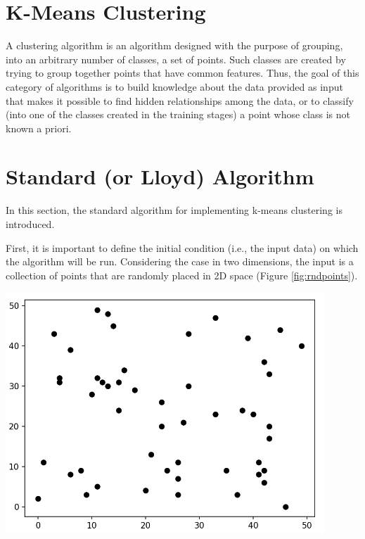 \documentclass{report}
\begin{document}
\begin{minipage}[b]{0.48\textwidth}
  \section*{K-Means Clustering}
  A clustering algorithm is an algorithm designed with the purpose of grouping, into an arbitrary number of classes, a set of points. Such classes are created by trying to group together points that have common features. Thus, the goal of this category of algorithms is to build knowledge about the data provided as input that makes it possible to find hidden relationships among the data, or to classify (into one of the classes created in the training stages) a point whose class is not known a priori.

  \section*{Standard (or Lloyd) Algorithm}
  In this section, the standard algorithm for implementing k-means clustering is introduced. 

  First, it is important to define the initial condition (i.e., the input data) on which the algorithm will be run. Considering the case in two dimensions, the input is a collection of points that are randomly placed in 2D space (Figure \ref{fig:rndpoints}).

  \begin{center} 
      \includegraphics[width = 0.9\textwidth]{imgs/rndpoints.png}
      \label{fig:rndpoints}
  \end{center}


\end{minipage}
\end{document}
